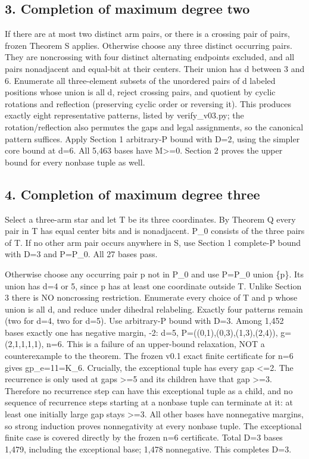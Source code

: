 \documentclass[
  10pt,
]{article}
\begin{document}
\subsection{3. Completion of maximum degree
two}\label{completion-of-maximum-degree-two}

If there are at most two distinct arm pairs, or there is a crossing pair
of pairs, frozen Theorem S applies. Otherwise choose any three distinct
occurring pairs. They are noncrossing with four distinct alternating
endpoints excluded, and all pairs nonadjacent and equal-bit at their
centers. Their union has d between 3 and 6. Enumerate all three-element
subsets of the unordered pairs of d labeled positions whose union is all
d, reject crossing pairs, and quotient by cyclic rotations and
reflection (preserving cyclic order or reversing it). This produces
exactly eight representative patterns, listed by verify\_v03.py; the
rotation/reflection also permutes the gaps and legal assignments, so the
canonical pattern suffices. Apply Section 1 arbitrary-P bound with D=2,
using the simpler core bound at d=6. All 5,463 bases have
M\textgreater=0. Section 2 proves the upper bound for every nonbase
tuple as well.

\subsection{4. Completion of maximum degree
three}\label{completion-of-maximum-degree-three}

Select a three-arm star and let T be its three coordinates. By Theorem Q
every pair in T has equal center bits and is nonadjacent. P\_0 consists
of the three pairs of T. If no other arm pair occurs anywhere in S, use
Section 1 complete-P bound with D=3 and P=P\_0. All 27 bases pass.

Otherwise choose any occurring pair p not in P\_0 and use P=P\_0 union
\{p\}. Its union has d=4 or 5, since p has at least one coordinate
outside T. Unlike Section 3 there is NO noncrossing restriction.
Enumerate every choice of T and p whose union is all d, and reduce under
dihedral relabeling. Exactly four patterns remain (two for d=4, two for
d=5). Use arbitrary-P bound with D=3. Among 1,452 bases exactly one has
negative margin, -2: d=5, P=((0,1),(0,3),(1,3),(2,4)), g=(2,1,1,1,1),
n=6. This is a failure of an upper-bound relaxation, NOT a
counterexample to the theorem. The frozen v0.1 exact finite certificate
for n=6 gives gp\_e=11=K\_6. Crucially, the exceptional tuple has every
gap \textless=2. The recurrence is only used at gaps \textgreater=5 and
its children have that gap \textgreater=3. Therefore no recurrence step
can have this exceptional tuple as a child, and no sequence of
recurrence steps starting at a nonbase tuple can terminate at it: at
least one initially large gap stays \textgreater=3. All other bases have
nonnegative margins, so strong induction proves nonnegativity at every
nonbase tuple. The exceptional finite case is covered directly by the
frozen n=6 certificate. Total D=3 bases 1,479, including the exceptional
base; 1,478 nonnegative. This completes D=3.
\end{document}
